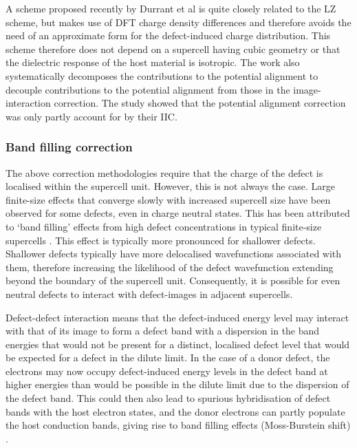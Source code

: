 \documentclass[11pt, twoside]{report}
\begin{document}
A scheme proposed recently by Durrant et al \cite{Durrant_defects} is quite closely related to the LZ scheme, but makes use of DFT charge density differences and therefore avoids the need of an approximate form for the defect-induced charge distribution. This scheme therefore does not depend on a supercell having cubic geometry or that the dielectric response of the host material is isotropic. The work also systematically decomposes the contributions to the potential alignment to decouple contributions to the potential alignment from those in the image-interaction correction. The study showed that the potential alignment correction was only partly account for by their IIC.


\subsubsection{Band filling correction}

The above correction methodologies require that the charge of the defect is localised within the supercell unit. However, this is not always the case. Large finite-size effects that converge slowly with increased supercell size have been observed for some defects, even in charge neutral states. This has been attributed to ‘band filling’ effects from high defect concentrations in typical finite-size supercells \cite{Lany_defects_2008, CIS_defects, pylada}. This effect is typically more pronounced for shallower defects. Shallower defects typically have more delocalised wavefunctions associated with them, therefore increasing the likelihood of the defect wavefunction extending beyond the boundary of the supercell unit. Consequently, it is possible for even neutral defects to interact with defect-images in adjacent supercells. 

Defect-defect interaction means that the defect-induced energy level may interact with that of its image to form a defect band with a dispersion in the band energies that would not be present for a distinct, localised defect level that would be expected for a defect in the dilute limit. In the case of a donor defect, the electrons may now occupy defect-induced energy levels in the defect band at higher energies than would be possible in the dilute limit due to the dispersion of the defect band. This could then also lead to spurious hybridisation of defect bands with the host electron states, and the donor electrons can partly populate the host conduction bands, giving rise to band filling effects (Moss-Burstein shift) \cite{Lany_defects_2008}.
\end{document}

